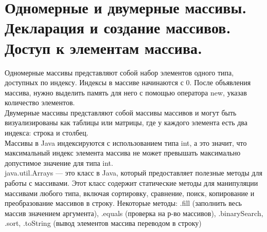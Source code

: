 \section{Одномерные и двумерные массивы. Декларация и создание массивов. Доступ к элементам массива.}
\normalsize{Одномерные массивы представляют собой набор элементов одного типа, доступных по индексу. Индексы в массиве начинаются с 0. После объявления массива, нужно выделить память для него с помощью оператора new, указав количество элементов. \\
Двумерные массивы представляют собой массивы массивов и могут быть визуализированы как таблицы или матрицы, где у каждого элемента есть два индекса: строка и столбец. \\
Массивы в Java индексируются с использованием типа int, а это значит, что максимальный индекс элемента массива не может превышать максимально допустимое значение для типа int. \\
java.util.Arrays — это класс в Java, который предоставляет полезные методы для работы с массивами. Этот класс содержит статические методы для манипуляции массивами любого типа, включая сортировку, сравнение, поиск, копирование и преобразование массивов в строку. Некоторые методы: .fill (заполнить весь массив значением аргумента), .equals (проверка на р-во массивов), .binarySearch, .sort, .toString (вывод элементов массива переводом в строку)} 
